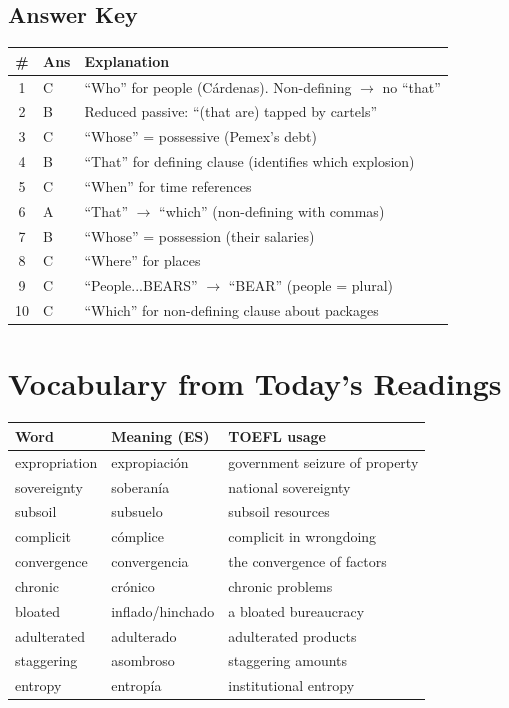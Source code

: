 \documentclass[10pt,a4paper]{article}
\begin{document}
\subsection*{Answer Key}

\begin{center}
\begin{tabular}{cll}
\toprule
\# & Ans & Explanation \\
\midrule
1 & C & ``Who'' for people (C\'ardenas). Non-defining $\to$ no ``that'' \\
2 & B & Reduced passive: ``(that are) tapped by cartels'' \\
3 & C & ``Whose'' = possessive (Pemex's debt) \\
4 & B & ``That'' for defining clause (identifies which explosion) \\
5 & C & ``When'' for time references \\
6 & A & ``That'' $\to$ ``which'' (non-defining with commas) \\
7 & B & ``Whose'' = possession (their salaries) \\
8 & C & ``Where'' for places \\
9 & C & ``People...BEARS'' $\to$ ``BEAR'' (people = plural) \\
10 & C & ``Which'' for non-defining clause about packages \\
\bottomrule
\end{tabular}
\end{center}

\section*{Vocabulary from Today's Readings}

\begin{center}
\small
\begin{tabular}{lll}
\toprule
\textbf{Word} & \textbf{Meaning (ES)} & \textbf{TOEFL usage} \\
\midrule
expropriation & expropiaci\'on & government seizure of property \\
sovereignty & soberan\'ia & national sovereignty \\
subsoil & subsuelo & subsoil resources \\
complicit & c\'omplice & complicit in wrongdoing \\
convergence & convergencia & the convergence of factors \\
chronic & cr\'onico & chronic problems \\
bloated & inflado/hinchado & a bloated bureaucracy \\
adulterated & adulterado & adulterated products \\
staggering & asombroso & staggering amounts \\
entropy & entrop\'ia & institutional entropy \\
\bottomrule
\end{tabular}
\end{center}
\end{document}
